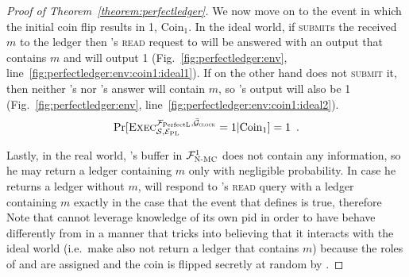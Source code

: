 \begin{proof}[Proof of Theorem~\ref{theorem:perfectledger}]
    We now move on to the event in which the initial coin flip results in 1,
    $\mathrm{Coin}_1$. In the ideal world, if \simulator{} \textsc{submit}s the
    received $m$ to the ledger then \environment's \textsc{read} request to
    \bob{} will be answered with an output that contains $m$ and
    \environment{} will output 1 (Fig.~\ref{fig:perfectledger:env},
    line~\ref{fig:perfectledger:env:coin1:ideal1}). If on the other hand
    \simulator{} does not \textsc{submit} it, then neither \bob's nor \alice's
    answer will contain $m$, so \environment's output will also be 1
    (Fig.~\ref{fig:perfectledger:env},
    line~\ref{fig:perfectledger:env:coin1:ideal2}).
    \begin{equation*}
      \Pr[\textsc{Exec}^{\mathcal{F}_{\mathrm{PerfectL}}, \bar{\mathcal{G}}_{\textsc{clock}}}_{\mathcal{S}, \mathcal{E}_{\mathrm{PL}}} = 1
      | \mathrm{Coin}_1] = 1 \enspace.
    \end{equation*}

    Lastly, in the real world, \bob's buffer in $\mathcal{F}_{\textsc{N-MC}}^1$ does not
    contain any information, so he may return a ledger containing $m$ only with
    negligible probability. In case he returns a ledger without $m$, \alice{}
    will respond to \environment's \textsc{read} query with a ledger containing
    $m$ exactly in the case that the event that defines \ppfetches{} is true,
    therefore
    Note that \perfectprot{} cannot leverage knowledge of its own pid in order
    to have \alice{} behave differently from \bob{} in a manner that tricks
    \perfectenv{} into believing that it interacts with the ideal world (i.e.\
    make \alice{} also not return a ledger that contains $m$) because the roles
    of \alice{} and \bob{} are assigned and the coin is flipped secretly at
    random by \perfectenv.


\end{proof}

